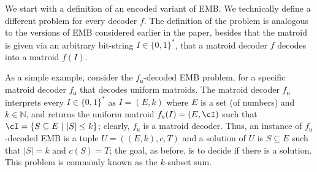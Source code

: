 	


We start with a definition of an encoded variant of EMB. We technically define a different problem for every decoder $f$. The definition of the problem is analogous to the versions of EMB considered earlier in the paper, besides that the matroid is given via an arbitrary bit-string $I \in \{0,1\}^*$, that a matroid decoder $f$ decodes into a matroid $f(I)$. 


As a simple example, consider the $f_{\textsf{u}}$-decoded EMB problem, for a specific matroid decoder $f_{\textsf{u}}$ that decodes uniform matroids. The matroid decoder $f_{\textsf{u}}$ interprets every $I \in \{0,1\}^*$ as $I = (E,k)$ where $E$ is a set (of numbers) and $k \in \mathbb{N}$, and returns the uniform matroid $f_{\textsf{u}}(I) = (E,\cI)$ such that $\cI = \{S \subseteq E~|~|S| \leq k\}$; clearly, $f_{\textsf{u}}$ is a matroid decoder. Thus, an instance of $f_{\textsf{u}}$-decoded EMB is a tuple $U = ((E,k),c,T)$ and a solution of $U$ is $S \subseteq E$ such that $|S| = k$ and $c(S) = T$; the goal, as before, is to decide if there is a solution. This problem is commonly known as the $k$-{\sc subset sum}.  


